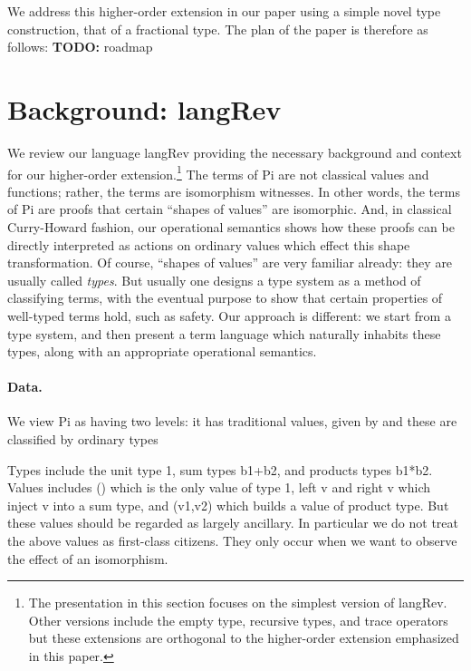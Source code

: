 \documentclass{llncs}
\newcommand{\todo}[1]{\textbf{TODO:} #1}
\begin{document}
We address this higher-order extension in our paper using a simple novel type
construction, that of a fractional type. The plan of the paper is therefore
as follows: \todo{roadmap}

\section{Background: {{langRev}} }

We review our language {{langRev}} providing the necessary background and
context for our higher-order extension.\footnote{The presentation in this
  section focuses on the simplest version of {{langRev}}. Other versions
  include the empty type, recursive types, and trace operators but these
  extensions are orthogonal to the higher-order extension emphasized in this
  paper.} The terms of {{Pi}} are not classical values and functions; rather,
the terms are isomorphism witnesses.  In other words, the terms of {{Pi}} are
proofs that certain ``shapes of values'' are isomorphic.  And, in classical
Curry-Howard fashion, our operational semantics shows how these proofs can be
directly interpreted as actions on ordinary values which effect this shape
transformation. Of course, ``shapes of values'' are very familiar already:
they are usually called \emph{types}.  But usually one designs a type system
as a method of classifying terms, with the eventual purpose to show that
certain properties of well-typed terms hold, such as safety.  Our approach is
different: we start from a type system, and then present a term language
which naturally inhabits these types, along with an appropriate operational
semantics.

\paragraph*{Data.}
We view {{Pi}} as having two levels:  it has traditional values, given by
and these are classified by ordinary types

Types include the unit type {{1}}, sum types {{b1+b2}}, and products types
{{b1*b2}}.  Values includes {{()}} which is the only value of type {{1}},
{{left v}} and {{right v}} which inject {{v}} into a sum type, and
{{(v1,v2)}} which builds a value of product type. But these values should be
regarded as largely ancillary.  In particular we do not treat the above
values as first-class citizens.  They only occur when we want to observe the
effect of an isomorphism.
\end{document}
